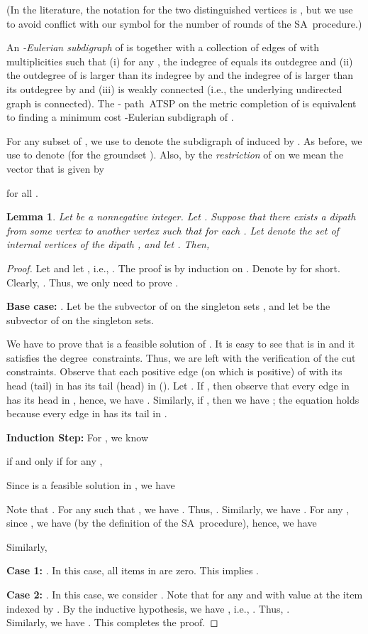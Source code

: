\documentclass[11pt]{article}
\newtheorem{lemma}[theorem]{Lemma}
\newcommand{\iSA}{\textsf{SA}}
\begin{document}
(In the literature, the notation for the two distinguished vertices is
, but we use  to avoid conflict with our symbol  for the
number of rounds of the \iSA\ procedure.)

An \textit{-Eulerian subdigraph}  of  is  together
with a collection of edges of  with multiplicities such that (i) for
any , the indegree of  equals its outdegree and
(ii) the outdegree of  is larger than its indegree by  and the
indegree of  is larger than its outdegree by  and (iii) 
is weakly connected (i.e., the underlying undirected graph is
connected). The - path~ATSP on the metric completion  of 
is equivalent to finding a minimum cost -Eulerian subdigraph of
.


For any subset  of , we use  to denote
the subdigraph of  induced by . As before, we use  to denote  (for the groundset ). Also, by the \emph{restriction} of  on  we mean the vector
 that
is given by

for all .



\begin{lemma}
\label{reduction}
Let  be a nonnegative integer.
Let .
Suppose that there exists a dipath 
from some vertex  to another vertex 
such that
 for each .
Let  denote the set of internal vertices of the dipath , and
let .
Then,

\end{lemma}

\begin{proof}
Let  and let
, i.e., .
The proof is by induction on .
Denote  by  for short.
Clearly, .
Thus, we only need to prove
.

\noindent \textbf{Base case:}
.
Let  be the subvector of  on the singleton sets
, and let  be the subvector of
 on the singleton sets.

We have to prove that  is a feasible solution of
. It is easy to see that
 is in  and it satisfies the
degree~constraints. Thus, we are left with the verification of the cut
constraints.  Observe that each positive edge (on which  is
positive) of  with its head (tail) in  has its tail (head) in
 ().
Let .
If , then
observe that every edge in  has
its head in , hence, we have
.
Similarly, if , then we have
;
the equation holds because every edge in  has
its tail in .

\noindent \textbf{Induction Step:}
For , we know

if and only if for any ,


Since  is a feasible solution in , we
have


Note that . For any  such that
, we have . Thus,
.
Similarly, we have  .
For any , since , we have
 (by the definition of the \iSA\ procedure),
hence, we have

Similarly,

\noindent \textbf{Case 1:} .
In this case, all items in  are zero. This implies .

\noindent \textbf{Case 2:} .
In this case, we consider . Note that
 for any  and
 with value 
at the item indexed by .
By the inductive hypothesis, we have
, i.e.,
. Thus, .
\\
Similarly, we have . This completes the proof.
\end{proof}
\end{document}

